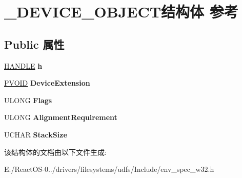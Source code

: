 \hypertarget{struct___d_e_v_i_c_e___o_b_j_e_c_t}{}\section{\+\_\+\+D\+E\+V\+I\+C\+E\+\_\+\+O\+B\+J\+E\+C\+T结构体 参考}
\label{struct___d_e_v_i_c_e___o_b_j_e_c_t}
\subsection*{Public 属性}
\begin{DoxyCompactItemize}
\item 
\mbox{\label{struct___d_e_v_i_c_e___o_b_j_e_c_t_a0038fa538d9da2d008a5b01a8be6fb5c}} 
\hyperlink{interfacevoid}{H\+A\+N\+D\+LE} {\bfseries h}
\item 
\mbox{\label{struct___d_e_v_i_c_e___o_b_j_e_c_t_aed92280a2fb4e1b3fa6d0e3edd5cc891}} 
\hyperlink{interfacevoid}{P\+V\+O\+ID} {\bfseries Device\+Extension}
\item 
\mbox{\label{struct___d_e_v_i_c_e___o_b_j_e_c_t_ad294ac72a23ab3215f576642d4f00d29}} 
U\+L\+O\+NG {\bfseries Flags}
\item 
\mbox{\label{struct___d_e_v_i_c_e___o_b_j_e_c_t_a42d5d1f78cd7ec2e3f02b13c6bf2761e}} 
U\+L\+O\+NG {\bfseries Alignment\+Requirement}
\item 
\mbox{\label{struct___d_e_v_i_c_e___o_b_j_e_c_t_a980b6a3e2db25e68932d7966526ef6d4}} 
U\+C\+H\+AR {\bfseries Stack\+Size}
\end{DoxyCompactItemize}


该结构体的文档由以下文件生成\+:\begin{DoxyCompactItemize}
\item 
E\+:/\+React\+O\+S-\/0../drivers/filesystems/udfs/\+Include/env\+\_\+spec\+\_\+w32.\+h\end{DoxyCompactItemize}
